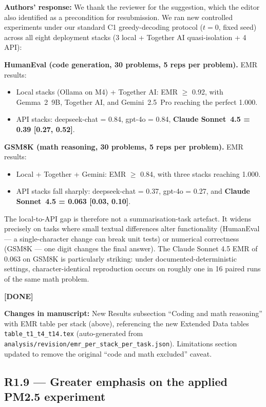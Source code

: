 \documentclass[11pt,a4paper]{article}
\newcommand{\response}[1]{\par\noindent\textbf{\color{revgreen}Authors' response:} #1\par}
\newcommand{\changes}[1]{\par\noindent\textbf{\color{revblue}Changes in manuscript:} #1\par}
\newcommand{\done}{\color{revgreen}\textbf{[DONE]}}
\begin{document}
\response{We thank the reviewer for the suggestion, which the editor also identified as a precondition for resubmission. We ran new controlled experiments under our standard C1 greedy-decoding protocol ($t{=}0$, fixed seed) across all eight deployment stacks (3 local + Together AI quasi-isolation + 4 API):

\textbf{HumanEval (code generation, 30 problems, 5 reps per problem).} EMR results:
\begin{itemize}[leftmargin=*]
  \item Local stacks (Ollama on M4) + Together AI: EMR $\geq$ 0.92, with Gemma~2~9B, Together AI, and Gemini~2.5~Pro reaching the perfect 1.000.
  \item API stacks: deepseek-chat = 0.84, gpt-4o = 0.84, \textbf{Claude Sonnet~4.5 = 0.39 [0.27, 0.52]}.
\end{itemize}

\textbf{GSM8K (math reasoning, 30 problems, 5 reps per problem).} EMR results:
\begin{itemize}[leftmargin=*]
  \item Local + Together + Gemini: EMR $\geq$ 0.84, with three stacks reaching 1.000.
  \item API stacks fall sharply: deepseek-chat = 0.37, gpt-4o = 0.27, and \textbf{Claude Sonnet~4.5 = 0.063 [0.03, 0.10]}.
\end{itemize}

The local-to-API gap is therefore not a summarisation-task artefact. It widens precisely on tasks where small textual differences alter functionality (HumanEval --- a single-character change can break unit tests) or numerical correctness (GSM8K --- one digit changes the final answer). The Claude Sonnet 4.5 EMR of 0.063 on GSM8K is particularly striking: under documented-deterministic settings, character-identical reproduction occurs on roughly one in 16 paired runs of the same math problem.} \done

\changes{New Results subsection ``Coding and math reasoning'' with EMR table per stack (above), referencing the new Extended Data tables \texttt{table\_t1\_t4\_t14.tex} (auto-generated from \texttt{analysis/revision/emr\_per\_stack\_per\_task.json}). Limitations section updated to remove the original ``code and math excluded'' caveat.}

\subsection*{R1.9 --- Greater emphasis on the applied PM2.5 experiment}
\end{document}
